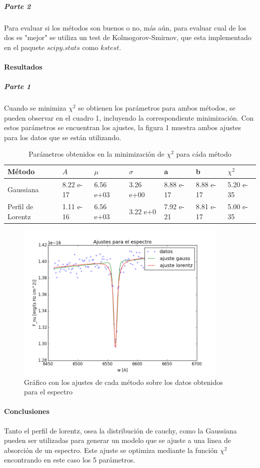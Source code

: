 \documentclass[prl,showpacs, twocolumn]{revtex4-1}
\begin{document}
\subparagraph{Parte 2}
Para evaluar si los m\'etodos son buenos o no, m\'as a\'un, para evaluar cual de los dos es "mejor" se utiliza un test de Kolmogorov-Smirnov, que esta implementado en el paquete $scipy.stats$ como $kstest$.

\bigskip
\paragraph{Resultados}
\subparagraph{Parte 1}
Cuando se minimiza $\chi^2$ se obtienen los par\'ametros para ambos m\'etodos, se pueden observar en el cuadro 1, incluyendo la correspondiente minimizaci\'on. Con estos par\'ametros se encuentran los ajustes, la figura 1 muestra ambos ajustes para los datos que se est\'an utilizando.

\begin{table} [h!]
\centering
\begin{tabular}{|p{3cm}|p{2cm}|p{2cm}|p{2cm}|p{2cm}|p{2cm}|p{2cm}|}
\hline
M\'etodo & $A$ & $\mu$ & $\sigma$ &a&b& $\chi^2$ \\
\hline
 Gaussiana&  8.22 e-17 & 6.56 e+03 & 3.26 e+00 &  8.88 e-17  & 8.88 e-17& 5.20 e-35\\\hline
 Perfil de Lorentz&  1.11 e-16 & 6.56 e+03 &3.22 e+0& 7.92 e-21 & 8.81 e-17 & 5.00 e-35\\
\hline
\end{tabular}
\caption{Par\'ametros obtenidos en la minimizaci\'on de $\chi^2$ para c\'ada m\'etodo }
\label{ }
\end{table}



\begin{figure} [h!]
\begin{center}
\includegraphics[width=4in]{1.png}
\caption{Gr\'afico con los ajustes de cada m\'etodo sobre los datos obtenidos para el espectro}
\label{ }
\end{center}
\end{figure}

\newpage
\paragraph{Conclusiones}
Tanto el perfil de lorentz, osea la distribuci\'on de cauchy, como la Gaussiana pueden ser utilizadas para generar un modelo que se ajuste a una linea de absorci\'on de un espectro. Este ajuste se optimiza mediante la funci\'on $\chi^2$ encontrando en este caso los 5 par\'ametros. 
\end{document}
